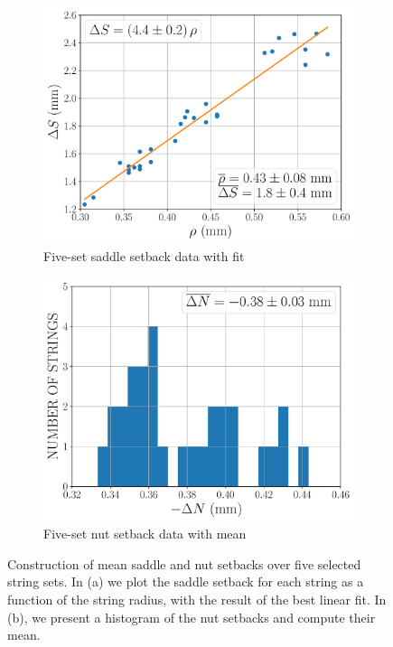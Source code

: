 \begin{figure}
  \centering
  \begin{subfigure}[b]{0.8\textwidth}
   \centering
   \includegraphics[width=5.0in]{figures/fit_ds}
   \caption{Five-set saddle setback data with fit}
   \label{fig:fit_ds}
  \end{subfigure}
  \par\vspace{0.25in}
  \begin{subfigure}[b]{0.8\textwidth}
   \centering
   \includegraphics[width=5.0in]{figures/hist_dn}
   \caption{Five-set nut setback data with mean}
   \label{fig:hist_dn}
  \end{subfigure}
  \caption{\label{fig:dsdn_mean} Construction of mean saddle and nut setbacks over five selected string sets. In (a) we plot the saddle setback for each string as a function of the string radius, with the result of the best linear fit. In (b), we present a histogram of the nut setbacks and compute their mean.}
 \end{figure}

